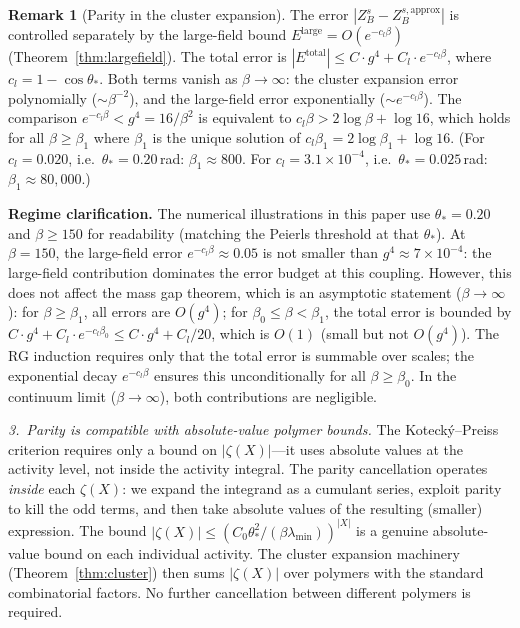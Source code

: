 \documentclass[11pt]{article}
\theoremstyle{definition}
\newtheorem{remark}[theorem]{Remark}
\begin{document}
\begin{remark}[Parity in the cluster expansion]
The error $|Z_B^s - Z_B^{s,\mathrm{approx}}|$ is controlled
separately by the large-field bound $E^{\mathrm{large}}
=O(e^{-c_l\beta})$ (Theorem~\ref{thm:largefield}).
The total error is
$|E^{\mathrm{total}}|\le C\cdot g^4 + C_l\cdot e^{-c_l\beta}$,
where $c_l=1-\cos\theta_*$.  Both terms vanish as
$\beta\to\infty$: the cluster expansion error polynomially
($\sim\beta^{-2}$), and the large-field error exponentially
($\sim e^{-c_l\beta}$).
The comparison $e^{-c_l\beta}<g^4=16/\beta^2$ is equivalent to
$c_l\beta>2\log\beta+\log 16$, which holds for all
$\beta\ge\beta_1$ where $\beta_1$ is the unique solution of
$c_l\beta_1=2\log\beta_1+\log 16$.
(For $c_l=0.020$, i.e.\ $\theta_*=0.20$\,rad:
$\beta_1\approx 800$.
For $c_l=3.1\times 10^{-4}$, i.e.\ $\theta_*=0.025$\,rad:
$\beta_1\approx 80{,}000$.)

\textbf{Regime clarification.}
The numerical illustrations in this paper use $\theta_*=0.20$
and $\beta\ge 150$ for readability (matching the Peierls threshold
at that $\theta_*$).  At $\beta=150$, the large-field error
$e^{-c_l\beta}\approx 0.05$ is not smaller than $g^4\approx 7\times
10^{-4}$: the large-field contribution dominates the error budget
at this coupling.  However, this does not affect the mass gap
theorem, which is an asymptotic statement ($\beta\to\infty$):
for $\beta\ge\beta_1$, all errors are $O(g^4)$; for
$\beta_0\le\beta<\beta_1$, the total error is bounded by
$C\cdot g^4+C_l\cdot e^{-c_l\beta_0}\le C\cdot g^4+C_l/20$,
which is $O(1)$ (small but not $O(g^4)$).  The RG induction
requires only that the total error is summable over scales;
the exponential decay $e^{-c_l\beta}$ ensures this
unconditionally for all $\beta\ge\beta_0$.
In the continuum limit ($\beta\to\infty$), both contributions
are negligible.

\emph{3.~Parity is compatible with absolute-value polymer bounds.}
The Koteck\'y--Preiss criterion requires only a bound on
$|\zeta(X)|$---it uses absolute values at the activity
level, not inside the activity integral.  The parity cancellation
operates \emph{inside} each $\zeta(X)$: we expand the integrand
as a cumulant series, exploit parity to kill the odd terms, and
then take absolute values of the resulting (smaller) expression.
The bound $|\zeta(X)|\le(C_0\theta_*^2/(\beta\lambda_{\min}))^{|X|}$
is a genuine absolute-value bound on each individual activity.
The cluster expansion machinery (Theorem~\ref{thm:cluster}) then
sums $|\zeta(X)|$ over polymers with the standard combinatorial
factors.  No further cancellation between different polymers
is required.


\end{remark}
\end{document}
